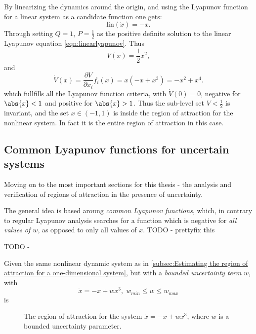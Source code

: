 By linearizing the dynamics around the origin, and using the Lyapunov function
for a linear system as a candidate function one gets:
\[
  \text{lin}(\dot{x}) = -x.
\]
Through setting \(Q=1\), \(P=\frac{1}{2}\) as the positive definite solution to
the linear Lyapunov equation \ref{eqn:linearlyapunov}. Thus
\[
  V(x) = \frac{1}{2}x^2,
\]
and
\[
  \dot{V}(x) = \frac{\partial V}{\partial x_i} f_i(x) = x(-x + x^3) = -x^2 +
  x^4.
\]
which fullfills all the Lyapunov function criteria, with \(\dot{V}(0) = 0\),
negative for \(\abs{x}<1\) and positive for \(\abs{x} > 1\). Thus the sub-level
set \(V < \frac{1}{2}\) is invariant, and the set \(x \in \left( -1, 1 \right)\)
is inside the region of attraction for the nonlinear system. In fact it is the
entire region of attraction in this case.

\subsection{Common Lyapunov functions for uncertain systems}

Moving on to the most important sections for this thesis - the analysis and
verification of regions of attraction in the presence of uncertainty.

The general idea is based aroung \textit{common Lyapunov functions}, which, in
contrary to regular Lyapunov analysis searches for a function which is negative
for \textit{all values of \(w\)}, as opposed to only all values of \(x\). TODO -
prettyfix this

\begin{definition}
  TODO -
\end{definition}

\begin{example}
  Given the same nonlinear dynamic system as in \ref{subsec:Estimating the
    region of attraction for a one-dimensional system}, but with a
  \textit{bounded uncertainty term} \(w\), with
  \[
    \dot{x} = -x + wx^3, \; w_{min} \leq w \leq w_{max}
  \]
  is

  \begin{figure}
    
    \caption{The region of attraction for the system \(\dot{x} = -x + wx^3\),
      where \(w\) is a bounded uncertainty parameter.}
  \end{figure}
\end{example}

